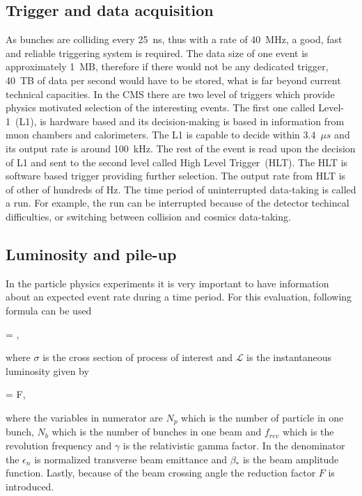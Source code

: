 \subsection{Trigger and data acquisition}

As bunches are colliding every 25~ns, thus with a rate of 40~MHz, a good, fast and reliable triggering system is required. The data size of one event is approximately 1~MB, therefore if there would not be any dedicated trigger, 40~TB of data per second would have to be stored, what is far beyond current technical capacities. In the CMS there are two level of triggers which provide physics motivated selection of the interesting events. The first one called Level-1~(L1), is hardware based and its decision-making is based in information from muon chambers and calorimeters. The L1 is capable to decide within 3.4~$\mu s$ and its output rate is around 100~kHz. The rest of the event is read upon the decision of L1 and sent to the second level called High Level Trigger~(HLT). The HLT is software based trigger providing further selection. The output rate from HLT is of other of hundreds of Hz. The time period of uninterrupted data-taking is called a run. For example, the run can be interrupted because of the detector techincal difficulties, or switching between collision and cosmics data-taking.

\subsection{Luminosity and pile-up}

In the particle physics experiments it is very important to have information about an expected event rate during a time period. For this evaluation, following formula can be used

{
  = \sigma \times {},
}

where $\sigma$ is the cross section of process of interest and $\mathcal{L}$ is the instantaneous luminosity given by

{
  = F,
}

where the variables in numerator are $N_{p}$ which is the number of particle in one bunch, $N_{b}$ which is the number of bunches in one beam and $f_{rev}$ which is the revolution frequency and $\gamma$ is the relativistic gamma factor. In the denominator the $\epsilon_{n}$ is normalized transverse beam emittance and $\beta_{*}$ is the beam amplitude function. Lastly, because of the beam crossing angle the reduction factor $F$ is introduced.

